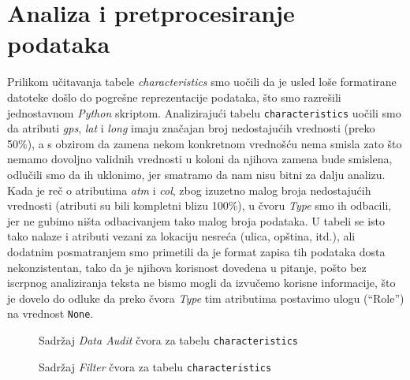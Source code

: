 \documentclass[a4paper,10pt]{article}
\begin{document}
\section{Analiza i pretprocesiranje podataka}
Prilikom učitavanja tabele \textit{characteristics} smo uočili da je usled loše formatirane datoteke došlo do pogrešne reprezentacije podataka, što smo razrešili jednostavnom \textit{Python} skriptom.
Analizirajući tabelu \texttt{characteristics} uočili smo da atributi \textit{gps}, \textit{lat} i \textit{long} imaju značajan broj 
nedostajućih vrednosti (preko 50\%), a s obzirom da zamena nekom konkretnom vrednošću nema smisla zato što nemamo dovoljno validnih vrednosti u koloni da njihova zamena bude smislena,
odlučili smo da ih uklonimo, jer smatramo da nam nisu bitni za dalju analizu. Kada je reč o atributima \textit{atm} i \textit{col}, 
zbog izuzetno malog broja nedostajućih vrednosti (atributi su bili kompletni blizu 100\%), u čvoru \textit{Type} smo ih odbacili, 
jer ne gubimo ništa odbacivanjem tako malog broja podataka. U tabeli se isto tako nalaze i atributi vezani za lokaciju nesreća (ulica, opština, itd.),
ali dodatnim posmatranjem smo primetili da je format zapisa tih podataka dosta nekonzistentan, tako da je njihova korisnost dovedena u pitanje,
pošto bez iscrpnog analiziranja teksta ne bismo mogli da izvučemo korisne informacije, što je dovelo do odluke da preko čvora \textit{Type} 
tim atributima postavimo ulogu (``Role'') na vrednost \texttt{None}.

\begin{figure}[h!]
 \centering
 \caption{Sadržaj \textit{Data Audit} čvora za tabelu \texttt{characteristics}}
\end{figure}

\begin{figure}[h!]
 \centering
 \caption{Sadržaj \textit{Filter} čvora za tabelu \texttt{characteristics}}
\end{figure}
\end{document}
